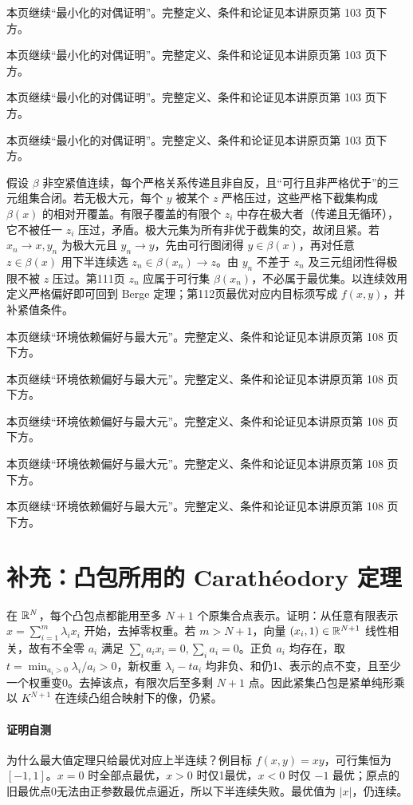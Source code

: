 本页继续“最小化的对偶证明”。完整定义、条件和论证见本讲原页第 103 页下方。

本页继续“最小化的对偶证明”。完整定义、条件和论证见本讲原页第 103 页下方。

本页继续“最小化的对偶证明”。完整定义、条件和论证见本讲原页第 103 页下方。

本页继续“最小化的对偶证明”。完整定义、条件和论证见本讲原页第 103 页下方。

假设 $\beta$ 非空紧值连续，每个严格关系传递且非自反，且“可行且非严格优于”的三元组集合闭。若无极大元，每个 $y$ 被某个 $z$ 严格压过，这些严格下截集构成 $\beta(x)$ 的相对开覆盖。有限子覆盖的有限个 $z_i$ 中存在极大者（传递且无循环），它不被任一 $z_i$ 压过，矛盾。极大元集为所有非优于截集的交，故闭且紧。若 $x_n\to x,y_n$ 为极大元且 $y_n\to y$，先由可行图闭得 $y\in\beta(x)$，再对任意 $z\in\beta(x)$ 用下半连续选 $z_n\in\beta(x_n)\to z$。由 $y_n$ 不差于 $z_n$ 及三元组闭性得极限不被 $z$ 压过。第111页 $z_n$ 应属于可行集 $\beta(x_n)$，不必属于最优集。以连续效用定义严格偏好即可回到 Berge 定理；第112页最优对应内目标须写成 $f(x,y)$，并补紧值条件。

本页继续“环境依赖偏好与最大元”。完整定义、条件和论证见本讲原页第 108 页下方。

本页继续“环境依赖偏好与最大元”。完整定义、条件和论证见本讲原页第 108 页下方。

本页继续“环境依赖偏好与最大元”。完整定义、条件和论证见本讲原页第 108 页下方。

本页继续“环境依赖偏好与最大元”。完整定义、条件和论证见本讲原页第 108 页下方。

本页继续“环境依赖偏好与最大元”。完整定义、条件和论证见本讲原页第 108 页下方。

\clearpage\section*{补充：凸包所用的 Carathéodory 定理}
在 $\mathbb{R}^N$，每个凸包点都能用至多 $N+1$ 个原集合点表示。证明：从任意有限表示 $x=\sum_{i=1}^m\lambda_i x_i$ 开始，去掉零权重。若 $m>N+1$，向量 $(x_i,1)\in\mathbb{R}^{N+1}$ 线性相关，故有不全零 $a_i$ 满足 $\sum_i a_ix_i=0,\sum_i a_i=0$。正负 $a_i$ 均存在，取 $t=\min_{a_i>0}\lambda_i/a_i>0$，新权重 $\lambda_i-ta_i$ 均非负、和仍1、表示的点不变，且至少一个权重变0。去掉该点，有限次后至多剩 $N+1$ 点。因此紧集凸包是紧单纯形乘以 $K^{N+1}$ 在连续凸组合映射下的像，仍紧。
\paragraph{证明自测} 为什么最大值定理只给最优对应上半连续？例目标 $f(x,y)=xy$，可行集恒为 $[-1,1]$。$x=0$ 时全部点最优，$x>0$ 时仅1最优，$x<0$ 时仅 $-1$ 最优；原点的旧最优点0无法由正参数最优点逼近，所以下半连续失败。最优值为 $|x|$，仍连续。
